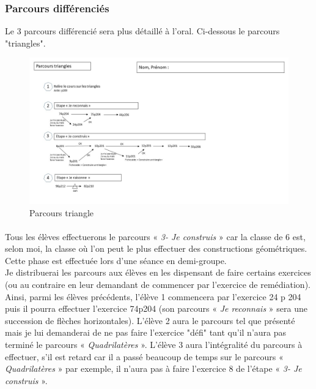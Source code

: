 \subsubsection*{Parcours différenciés}\label{parcours_diff3}
Le 3 parcours différencié sera plus détaillé à l'oral. Ci-dessous le parcours "triangles".
\begin{figure}[!h]
	\centering
	\includegraphics[scale=0.4]{img/parcours_triangles.jpg}
	\caption{Parcours triangle}
\end{figure}
\paragraph{}Tous les élèves effectuerons le parcours « \textit{3- Je construis} » car la classe de 6 est, selon moi, la classe où l'on peut le plus effectuer des constructions géométriques. Cette phase est effectuée lors d'une séance en demi-groupe.\\
Je distribuerai les parcours aux élèves en les dispensant de faire certains exercices (ou au contraire en leur demandant de commencer par l'exercice de remédiation).\\
Ainsi, parmi les élèves précédents, l'élève 1 commencera par l'exercice 24 p 204 puis il pourra effectuer l'exercice 74p204 (son parcours « \textit{Je reconnais} » sera une succession de flèches horizontales). L'élève 2 aura le parcours tel que présenté mais je lui demanderai de ne pas faire l'exercice "défi" tant qu'il n'aura pas terminé le parcours « \textit{Quadrilatères} ». L'élève 3 aura l'intégralité du parcours à effectuer, s'il est retard car il a passé beaucoup de temps sur le parcours « \textit{Quadrilatères} » par exemple, il n'aura pas à faire l'exercice 8 de l'étape « \textit{3- Je construis} ».
